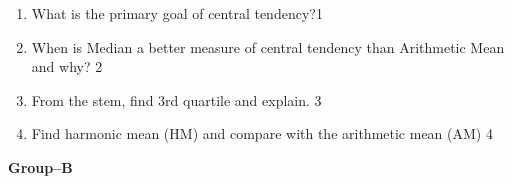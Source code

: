 \documentclass{article}
\begin{document}
\begin{enumerate}
  \begin{enumerate}
    \item
	What is the primary goal of central tendency?\hfill 1
    \item
	When is Median a better measure of central tendency than Arithmetic Mean and why? \hfill 2
    \item  
	From the stem, find 3rd quartile and explain. \hfill 3
    \item
	Find harmonic mean (HM) and compare with the arithmetic mean (AM) \hfill 4
  \end{enumerate}


    \begin{center}
  \textbf{Group--B}
  \end{center}
  

\end{enumerate}
\end{document}
